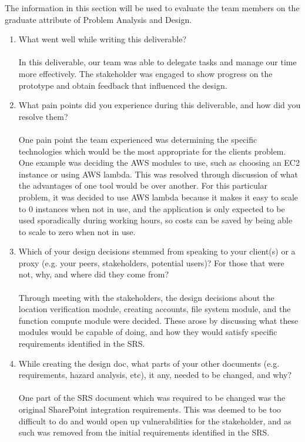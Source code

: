 \documentclass[12pt, titlepage]{article}
\begin{document}
  The information in this section will be used to evaluate the team
  members on the
  graduate attribute of Problem Analysis and Design.
  \begin{enumerate}
    \item What went well while writing this deliverable?
      \\
      \\
      In this deliverable, our team was able to delegate tasks and
      manage our time more effectively.
      The stakeholder was engaged to show progress on the prototype and
      obtain feedback that
      influenced the design.

    \item What pain points did you experience during this deliverable, and how
      did you resolve them?
      \\
      \\
      One pain point the team experienced was determining the specific
      technologies which would be the most appropriate
      for the clients problem. One example was deciding the AWS modules
      to use, such as choosing an EC2 instance or using AWS lambda.
      This was resolved through discussion of what the advantages of one
      tool would be over another. For this particular problem,
      it was decided to use AWS lambda because it makes it easy to scale
      to 0 instances when not in use, and the application is only expected to
      be used sporadically during working hours, so costs can be saved by
      being able to scale to zero when not in use.

    \item Which of your design decisions stemmed from speaking to your client(s)
      or a proxy (e.g. your peers, stakeholders, potential users)?
      For those that
      were not, why, and where did they come from?
      \\
      \\
      Through meeting with the stakeholders, the design decisions about
      the location verification module, creating accounts, file system module,
      and the function compute module were decided. These arose by
      discussing what these modules would be capable of doing, and how
      they would satisfy specific
      requirements identified in the SRS.

    \item While creating the design doc, what parts of your other
      documents (e.g.
      requirements, hazard analysis, etc), it any, needed to be
      changed, and why?
      \\
      \\
      One part of the SRS document which was required to be changed was
      the original SharePoint integration requirements. This was deemed
      to be too difficult to do and would open up vulnerabilities for
      the stakeholder, and as such was removed from the initial
      requirements identified in the SRS.


\end{enumerate}
\end{document}
